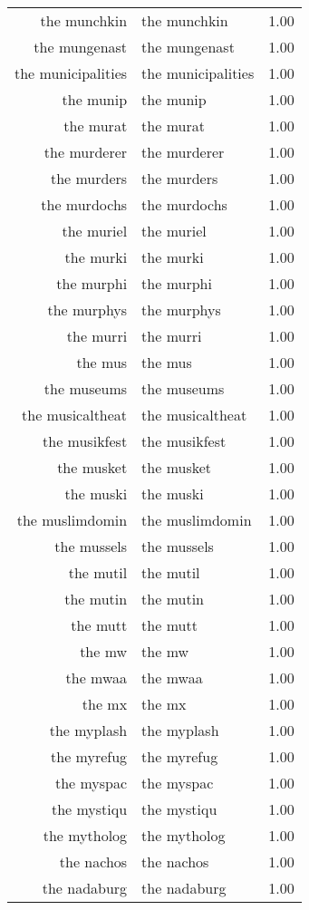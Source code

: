 \begin{table}[ht]
\begin{tabular}{rlr}
  the munchkin & the munchkin & 1.00 \\ 
  the mungenast & the mungenast & 1.00 \\ 
  the municipalities & the municipalities & 1.00 \\ 
  the munip & the munip & 1.00 \\ 
  the murat & the murat & 1.00 \\ 
  the murderer & the murderer & 1.00 \\ 
  the murders & the murders & 1.00 \\ 
  the murdochs & the murdochs & 1.00 \\ 
  the muriel & the muriel & 1.00 \\ 
  the murki & the murki & 1.00 \\ 
  the murphi & the murphi & 1.00 \\ 
  the murphys & the murphys & 1.00 \\ 
  the murri & the murri & 1.00 \\ 
  the mus & the mus & 1.00 \\ 
  the museums & the museums & 1.00 \\ 
  the musicaltheat & the musicaltheat & 1.00 \\ 
  the musikfest & the musikfest & 1.00 \\ 
  the musket & the musket & 1.00 \\ 
  the muski & the muski & 1.00 \\ 
  the muslimdomin & the muslimdomin & 1.00 \\ 
  the mussels & the mussels & 1.00 \\ 
  the mutil & the mutil & 1.00 \\ 
  the mutin & the mutin & 1.00 \\ 
  the mutt & the mutt & 1.00 \\ 
  the mw & the mw & 1.00 \\ 
  the mwaa & the mwaa & 1.00 \\ 
  the mx & the mx & 1.00 \\ 
  the myplash & the myplash & 1.00 \\ 
  the myrefug & the myrefug & 1.00 \\ 
  the myspac & the myspac & 1.00 \\ 
  the mystiqu & the mystiqu & 1.00 \\ 
  the mytholog & the mytholog & 1.00 \\ 
  the nachos & the nachos & 1.00 \\ 
  the nadaburg & the nadaburg & 1.00 \\ 

\end{tabular}
\end{table}
